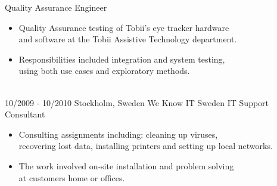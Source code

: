 \documentclass{markusos-cv}
\begin{document}
\begin{entrylist}
{Quality Assurance Engineer} 
{
\begin{itemize}
\item Quality Assurance testing of Tobii's eye tracker hardware\\ and software at the Tobii Assistive Technology department.
\item Responsibilities included integration and system testing,\\ using both use cases and exploratory methods.
\end{itemize} 
}
\\%
\entry
{10/2009 - 10/2010}
{Stockholm, Sweden}
{We Know IT Sweden}
{IT Support Consultant} 
{
\begin{itemize}
\item Consulting assignments including: cleaning up viruses,\\ recovering lost data, installing printers and setting up local networks.
\item The work involved on-site installation and problem solving\\ at customers home or offices.
\end{itemize} 
}
\end{entrylist}
\end{document}
